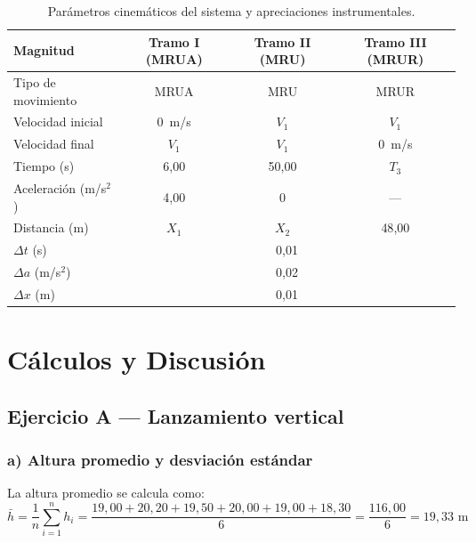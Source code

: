 \begin{table}[htbp]
  \centering
  \begin{tabular}{l c c c}
    \toprule
    Magnitud & Tramo I (MRUA) & Tramo II (MRU) & Tramo III (MRUR) \\
    \midrule
    Tipo de movimiento      & MRUA    & MRU     & MRUR   \\
    Velocidad inicial       & 0~m/s   & $V_1$   & $V_1$  \\
    Velocidad final         & $V_1$   & $V_1$   & 0~m/s  \\
    Tiempo (s)              & 6{,}00  & 50{,}00 & $T_3$  \\
    Aceleración (m/s$^2$)   & 4{,}00  & 0       & ---    \\
    Distancia (m)           & $X_1$   & $X_2$   & 48{,}00 \\
    \midrule
    $\Delta t$ (s)          & \multicolumn{3}{c}{0{,}01} \\
    $\Delta a$ (m/s$^2$)    & \multicolumn{3}{c}{0{,}02} \\
    $\Delta x$ (m)          & \multicolumn{3}{c}{0{,}01} \\
    \bottomrule
  \end{tabular}
  \caption{Parámetros cinemáticos del sistema y apreciaciones instrumentales.}
  \label{tab:datos_brutos}
\end{table}

\section{Cálculos y Discusión}

\subsection*{Ejercicio A — Lanzamiento vertical}

\subsubsection*{a) Altura promedio y desviación estándar}

La altura promedio se calcula como:
\[
\bar{h} = \frac{1}{n}\sum_{i=1}^{n} h_i
        = \frac{19{,}00 + 20{,}20 + 19{,}50 + 20{,}00 + 19{,}00 + 18{,}30}{6}
        = \frac{116{,}00}{6} = 19{,}33 \text{ m}
\]

